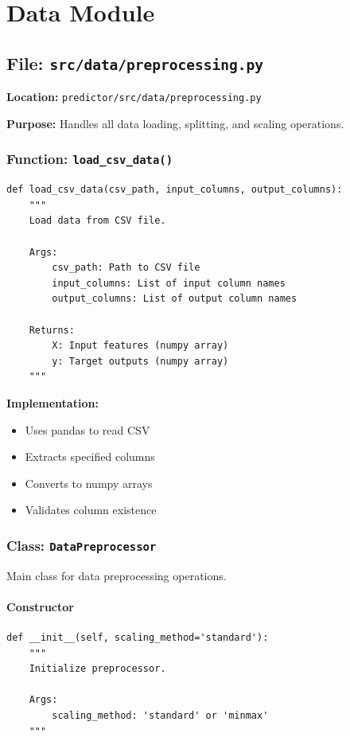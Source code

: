 \documentclass[11pt,a4paper]{article}
\begin{document}
\newpage
\section{Data Module}

\subsection{File: \texttt{src/data/preprocessing.py}}

\textbf{Location:} \texttt{predictor/src/data/preprocessing.py}

\textbf{Purpose:} Handles all data loading, splitting, and scaling operations.

\subsubsection{Function: \texttt{load\_csv\_data()}}

\begin{lstlisting}
def load_csv_data(csv_path, input_columns, output_columns):
    """
    Load data from CSV file.

    Args:
        csv_path: Path to CSV file
        input_columns: List of input column names
        output_columns: List of output column names

    Returns:
        X: Input features (numpy array)
        y: Target outputs (numpy array)
    """
\end{lstlisting}

\textbf{Implementation:}
\begin{itemize}
    \item Uses pandas to read CSV
    \item Extracts specified columns
    \item Converts to numpy arrays
    \item Validates column existence
\end{itemize}

\subsubsection{Class: \texttt{DataPreprocessor}}

Main class for data preprocessing operations.

\paragraph{Constructor}
\begin{lstlisting}
def __init__(self, scaling_method='standard'):
    """
    Initialize preprocessor.

    Args:
        scaling_method: 'standard' or 'minmax'
    """
\end{lstlisting}
\end{document}
